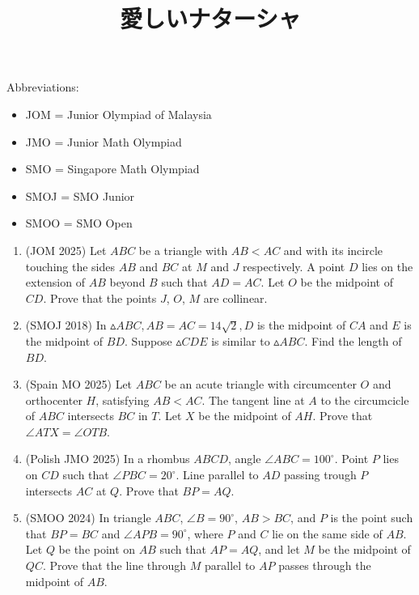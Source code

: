 \documentclass[12pt]{scrartcl}
\title{愛しいナターシャ}
\begin{document}
    \maketitle

\renewcommand*\contentsname{Daftar Isi}
\tableofcontents

\newpage
    Abbreviations:
    \begin{itemize}
        \item JOM = Junior Olympiad of Malaysia
        \item JMO = Junior Math Olympiad
        \item SMO = Singapore Math Olympiad
        \item SMOJ = SMO Junior
        \item SMOO = SMO Open
    \end{itemize}
    \begin{enumerate}
        \item (JOM 2025) Let $ABC$ be a triangle with $AB<AC$ and with its incircle touching the sides $AB$ and $BC$ at $M$ and $J$ respectively. A point $D$ lies on the extension of $AB$ beyond $B$ such that $AD=AC$. Let $O$ be the midpoint of $CD$. Prove that the points $J$, $O$, $M$ are collinear.

        \item (SMOJ 2018) In $\vartriangle ABC, AB=AC=14 \sqrt2 , D$ is the midpoint of $CA$ and $E$ is the midpoint of $BD$. Suppose $\vartriangle CDE$ is similar to $\vartriangle ABC$. Find the length of $BD$.

        \item (Spain MO 2025) Let $ABC$ be an acute triangle with circumcenter $O$ and orthocenter $H$, satisfying $AB<AC$. The tangent line at $A$ to the circumcicle of $ABC$ intersects $BC$ in $T$. Let $X$ be the midpoint of $AH$. Prove that $\angle ATX=\angle OTB$.

        \item (Polish JMO 2025) In a rhombus $ABCD$, angle $\angle ABC=100^{\circ}$. Point $P$ lies on $CD$ such that $\angle PBC=20^{\circ}$. Line parallel to $AD$ passing trough $P$ intersects $AC$ at $Q$. Prove that $BP=AQ$.

        \item (SMOO 2024) In triangle $ABC$, $\angle B=90^\circ$, $AB>BC$, and $P$ is the point such that $BP=BC$ and $\angle APB=90^\circ$, where $P$ and $C$ lie on the same side of $AB$. Let $Q$ be the point on $AB$ such that $AP=AQ$, and let $M$ be the midpoint of $QC$. Prove that the line through $M$ parallel to $AP$ passes through the midpoint of $AB$.


\end{enumerate}
\end{document}
